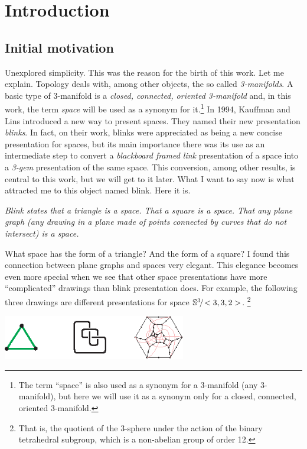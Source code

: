 \chapter{Introduction}

\vspace{-1cm}
\section{Initial motivation}
\label{sec:initialMotivation}

Unexplored simplicity. This was the reason for the birth of this work.
Let me explain. Topology deals with, among other objects, the so
called {\em 3-manifolds}. A basic type of 3-manifold is a {\em
closed, connected, oriented 3-manifold} and, in this work, the term
{\em space} will be used as a synonym for it.\footnote{The term
``space'' is also used as a synonym for a 3-manifold (any
3-manifold), but here we will use it as a synonym only for a closed,
connected, oriented 3-manifold.} In 1994, Kauffman and Lins
\cite{KauffmanAndLins1994} introduced a new way to present spaces.
They named their new presentation {\em blinks}. In fact, on their
work, blinks were appreciated as being a new concise presentation
for spaces, but its main importance there was its use as an
intermediate step to convert a {\em blackboard framed link}
presentation of a space into a {\em 3-gem} presentation of the same
space. This conversion, among other results, is central to this work,
but we will get to it later. What I want to say now is what
attracted me to this object named blink. Here it is.
\vspace{-0.3cm}
{\begin{center} \it
Blink states that a triangle is a space. That a square is a space.
That any plane graph (\ie any drawing in a plane made of
points connected by curves that do not intersect) is a space.
\end{center}}
\vspace{-0.3cm}
\noindent What space has the form of a
triangle? And the form of a square? I found this connection
between plane graphs and spaces very elegant. This elegance
becomes even more special when we see that other space
presentations have more ``complicated'' drawings than
blink presentation does. For example, the following three
drawings are different presentations for space $\mathbb{S}^3\!/\!<3,3,2>$. \footnote{That is, the quotient of the $3$-sphere
under the action of the binary tetrahedral subgroup, which is a non-abelian group of order 12.}
\begin{center}
\includegraphics[width=8cm]{A.figs/presentations.eps}
\end{center}
